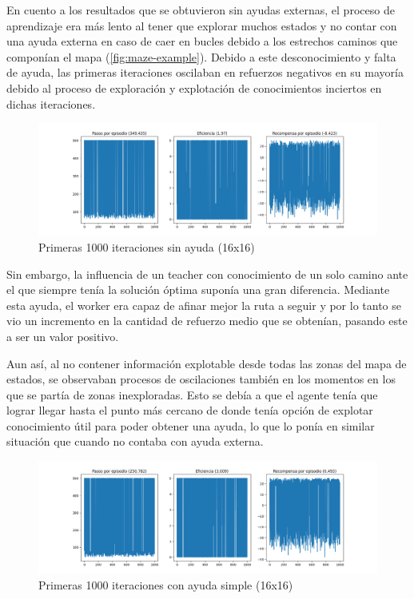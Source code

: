 \documentclass[letterpaper]{article} %
\begin{document}
En cuento a los resultados que se obtuvieron sin ayudas externas, el proceso de aprendizaje era más lento al tener que explorar muchos estados y
 no contar con una ayuda externa en caso de caer en bucles debido a los estrechos caminos que componían el mapa (\ref{fig:maze-example}). Debido
  a este desconocimiento y falta de ayuda, las primeras iteraciones oscilaban en refuerzos negativos en su mayoría debido al proceso de exploración
   y explotación de conocimientos inciertos en dichas iteraciones. 

\begin{figure}[H]
    \centering
    \includegraphics[width=0.9\columnwidth]{sin_ayuda_externa.png}
    \caption{Primeras 1000 iteraciones sin ayuda (16x16)\label{fig:FuN1}}
\end{figure}

Sin embargo, la influencia de un teacher con conocimiento de un solo camino ante el que siempre tenía la solución óptima suponía una gran diferencia.
 Mediante esta ayuda, el worker era capaz de afinar mejor la ruta a seguir y por lo tanto se vio un incremento en la cantidad de refuerzo medio que 
 se obtenían, pasando este a ser un valor positivo.

Aun así, al no contener información explotable desde todas las zonas del mapa de estados, se observaban procesos de oscilaciones también en los momentos
 en los que se partía de zonas inexploradas. Esto se debía a que el agente tenía que lograr llegar hasta el punto más cercano de donde tenía opción 
 de explotar conocimiento útil para poder obtener una ayuda, lo que lo ponía en similar situación que cuando no contaba con ayuda externa.

\begin{figure}[H]
    \centering
    \includegraphics[width=0.9\columnwidth]{ayuda_externa_1path.png}
    \caption{Primeras 1000 iteraciones con ayuda simple (16x16)\label{fig:FuN2}}
    
\end{figure}
\end{document}
